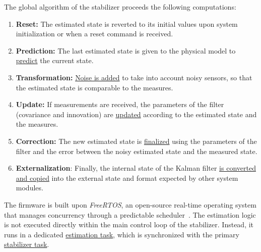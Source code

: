 The global algorithm of the stabilizer proceeds the following computations:
\begin{enumerate}
    \item \textbf{Reset:} The estimated state is reverted to its initial values upon system
          initialization or when a reset command is received.
    \item \textbf{Prediction:} The last estimated state is given to the physical model to
          \href{https://github.com/bitcraze/crazyflie-firmware/blob/b9d676aa3544b68eea17d11b0fbec437da909878/src/modules/src/kalman_core/kalman_core.c#L744C1-L791C2}
          {predict} the current state.
    \item \textbf{Transformation:} \href{https://github.com/bitcraze/crazyflie-firmware/blob/b9d676aa3544b68eea17d11b0fbec437da909878/src/modules/src/kalman_core/kalman_core.c#L613C1-L619C2}
          {Noise is added} to take into account noisy sensors, so that the estimated state is
          comparable to the measures.
    \item \textbf{Update:} If measurements are received, the parameters of the filter (covariance
          and innovation) are
          \href{https://github.com/bitcraze/crazyflie-firmware/blob/b9d676aa3544b68eea17d11b0fbec437da909878/src/modules/src/estimator/estimator_kalman.c#L299C1-L365C2}
          {updated} according to the estimated state and the measures.
    \item \textbf{Correction:} The new estimated state is
          \href{https://github.com/bitcraze/crazyflie-firmware/blob/b9d676aa3544b68eea17d11b0fbec437da909878/src/modules/src/kalman_core/kalman_core.c#L621C1-L742C2}
          {finalized} using the parameters of the filter and the error between the noisy estimated
          state and the measured state.
    \item \textbf{Externalization}: Finally, the internal state of the Kalman filter
          \href{https://github.com/bitcraze/crazyflie-firmware/blob/b9d676aa3544b68eea17d11b0fbec437da909878/src/modules/src/kalman_core/kalman_core.c#L744C1-L791C2}
          {is converted and copied} into the external state and format expected by other system
          modules.
\end{enumerate}

The firmware is built upon \textit{FreeRTOS}, an open-source real-time operating system that manages
concurrency through a predictable scheduler~\cite{freertos}. The estimation logic is not executed
directly within the main control loop of the stabilizer. Instead, it runs in a dedicated
\href{https://github.com/bitcraze/crazyflie-firmware/blob/b9d676aa3544b68eea17d11b0fbec437da909878/src/modules/src/estimator/estimator_kalman.c#L214}
{estimation task}, which is synchronized with the primary
\href{https://github.com/bitcraze/crazyflie-firmware/blob/b9d676aa3544b68eea17d11b0fbec437da909878/src/modules/src/stabilizer.c#L326}
{stabilizer task}.

